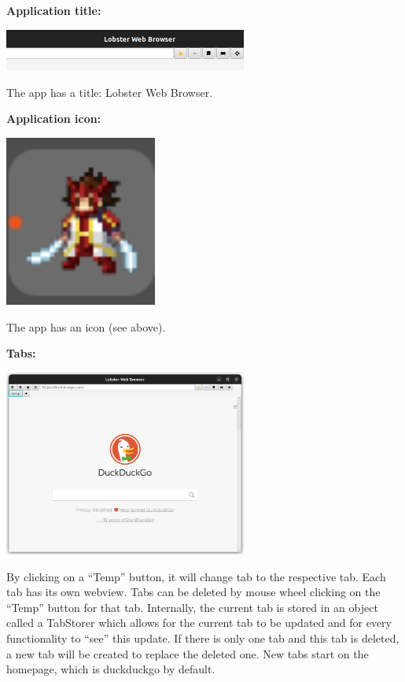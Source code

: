 \documentclass[10pt,a4paper]{report}
\begin{document}
	\LARGE \noindent \justifying \textbf{Application title:} \par
	\noindent \includegraphics[width=80mm]{images/title.png} \par
	\normalsize \justifying \noindent The app has a title: Lobster Web Browser. \par
	
	
	\LARGE \noindent \justifying \textbf{Application icon:} \par
	\noindent \includegraphics[width=50mm]{images/icon.png} \par
	\normalsize \noindent The app has an icon (see above). \par
	
	
	\LARGE \noindent \justifying \textbf{Tabs:} \par
	\noindent \includegraphics[width=80mm]{images/tabs.png} \par
	\normalsize \noindent By clicking on a “Temp” button, it will change tab to the respective tab. Each tab has its own webview. Tabs can be deleted by mouse wheel clicking on the “Temp” button for that tab. Internally, the current tab is stored in an object called a TabStorer which allows for the current tab to be updated and for every functionality to “see” this update. If there is only one tab and this tab is deleted, a new tab will be created to replace the deleted one. New tabs start on the homepage, which is duckduckgo by default. \par
	
\end{document}
